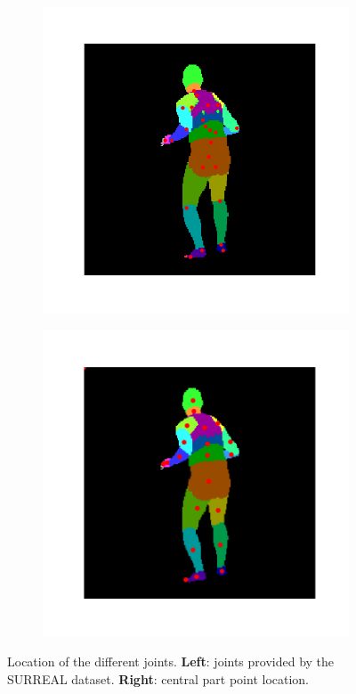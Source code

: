 \begin{figure}
\centering
\begin{subfigure}{.45\textwidth}
\centering
  \includegraphics[scale=0.2]{surreal_joints.png}
\end{subfigure}
\begin{subfigure}{.45\textwidth}
  \centering
  \includegraphics[scale=0.2]{central_point_parts.png}
\end{subfigure}
\caption{Location of the different joints. \textbf{Left}: joints provided by the SURREAL dataset. \textbf{Right}: central part point location.}
\label{hourglass:joints}
\end{figure}


